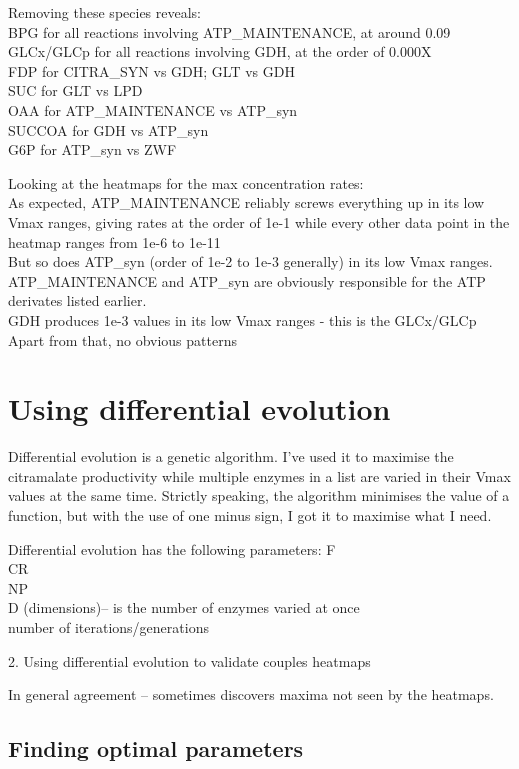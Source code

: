 \documentclass[parskip=full]{scrreprt}
\begin{document}
Removing these species reveals:\\
BPG for all reactions involving ATP\_MAINTENANCE, at around 0.09\\
GLCx/GLCp for all reactions involving GDH, at the order of 0.000X\\
FDP for CITRA\_SYN vs GDH; GLT vs GDH\\
SUC for GLT vs LPD\\
OAA for ATP\_MAINTENANCE vs ATP\_syn\\
SUCCOA for GDH vs ATP\_syn\\
G6P for ATP\_syn vs ZWF

Looking at the heatmaps for the max concentration rates:\\
As expected, ATP\_MAINTENANCE reliably screws everything up in its low Vmax ranges, giving rates at the order of 1e-1 while every other data point in the heatmap ranges from 1e-6 to 1e-11\\
But so does ATP\_syn (order of 1e-2 to 1e-3 generally) in its low Vmax ranges. ATP\_MAINTENANCE and ATP\_syn are obviously responsible for the ATP derivates listed earlier.\\
GDH produces 1e-3 values in its low Vmax ranges - this is the GLCx/GLCp\\
Apart from that, no obvious patterns

\section{Using differential evolution}
\label{sec:de}

Differential evolution is a genetic algorithm. I’ve used it to maximise the citramalate productivity while multiple enzymes in a list are varied in their Vmax values at the same time. Strictly speaking, the algorithm minimises the value of a function, but with the use of one minus sign, I got it to maximise what I need.

Differential evolution has the following parameters:
F\\
CR\\
NP\\
D (dimensions)-- is the number of enzymes varied at once\\
number of iterations/generations

2. Using differential evolution to validate couples heatmaps

In general agreement -- sometimes discovers maxima not seen by the heatmaps.

\subsection{Finding optimal parameters}
\label{ssec:deoptimise}
\end{document}
